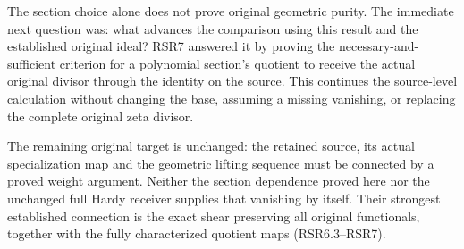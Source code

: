 The section choice alone does not prove original geometric purity. The
immediate next question was: what advances the comparison using this
result and the established original ideal? RSR7 answered it by proving
the necessary-and-sufficient criterion for a polynomial section's
quotient to receive the actual original divisor through the identity on
the source. This continues the source-level calculation without changing
the base, assuming a missing vanishing, or replacing the complete
original zeta divisor.

The remaining original target is unchanged: the retained source, its
actual specialization map and the geometric lifting sequence must be
connected by a proved weight argument. Neither the section dependence
proved here nor the unchanged full Hardy receiver supplies that
vanishing by itself. Their strongest established connection is the exact
shear preserving all original functionals, together with the fully
characterized quotient maps (RSR6.3--RSR7).
